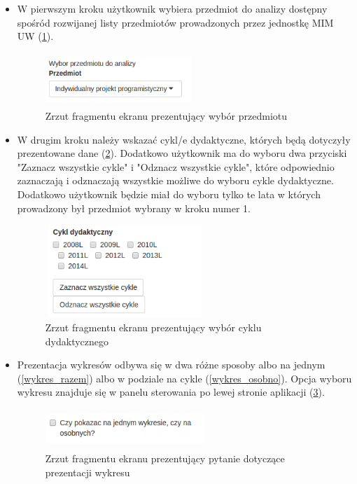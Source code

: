 \documentclass[]{article}
\begin{document}
\begin{itemize}
	\item 
	W pierwszym kroku użytkownik wybiera przedmiot do analizy dostępny spośród rozwijanej listy przedmiotów prowadzonych przez jednostkę MIM UW (\ref{przedmiot}).
	\begin{figure}[H]
		\centering
		\includegraphics[width=55mm,height=20mm]
		{obrazki/przedmiot.png}
		\caption{Zrzut fragmentu ekranu prezentujący wybór przedmiotu}
		\label{przedmiot}
	\end{figure}
	
	\item 
	W drugim kroku należy wskazać cykl/e dydaktyczne, których będą dotyczyły prezentowane dane (\ref{cykl}). Dodatkowo użytkownik ma do wyboru dwa przyciski "Zaznacz wszystkie cykle" i "Odznacz wszystkie cykle", które odpowiednio zaznaczają i odznaczają wszystkie możliwe do wyboru cykle dydaktyczne. Dodatkowo użytkownik będzie miał do wyboru tylko te lata w których prowadzony był przedmiot wybrany w kroku numer 1.
	\begin{figure}[H]
		\centering
		\includegraphics[width=60mm,height=35mm]
		{obrazki/cykl.png}
		\caption{Zrzut fragmentu ekranu prezentujący wybór cyklu dydaktycznego}
		\label{cykl}
	\end{figure}
	
	\item 
	Prezentacja wykresów odbywa się w dwa różne sposoby albo na jednym (\ref{wykres_razem}) albo w podziale na cykle (\ref{wykres_osobno}). Opcja wyboru wykresu znajduje się w panelu sterowania po lewej stronie aplikacji (\ref{na_jednym}).
	\begin{figure}[H]
		\centering
		\includegraphics[width=60mm,height=15mm]
		{obrazki/na-jednym.png}
		\caption{Zrzut fragmentu ekranu prezentujący pytanie dotyczące prezentacji wykresu}
		\label{na_jednym}
	\end{figure}
	

\end{itemize}
\end{document}
